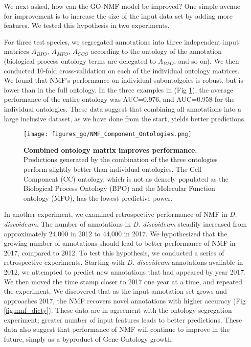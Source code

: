 \documentclass[12pt,a4paper]{report}
\begin{document}
{{We next asked, how can the GO-NMF model be improved? One simple avenue for improvement is to increase the size of the input data set by adding more features. We tested this hypothesis in two experiments.

For three test species, we segregated annotations into three independent input matrices $A_{BPO}$, $A_{MFO}$, $A_{CCO}$ according to the ontology of the annotation (biological process ontology terms are delegated to $A_{BPO}$, and so on). We then conducted 10-fold cross-validation on each of the individual ontology matrices. We found that NMF's performance on individual subontolgoies is robust, but is lower than in the full ontology. In the three examples in (Fig \ref{fig:nmf_ontologies}), the average performance of the entire ontology was AUC=0.976, and AUC=0.958 for the individual ontologies. These data suggest that combining all annotations into a large inclusive dataset, as we have done from the start, yields better predictions.

\begin{figure}
\begin{minipage}[c][\textheight]{\textwidth}
\vspace*{-5in}
\centering
  \texttt{[image: figures\_go/NMF\_Component\_Ontologies.png]}
  \caption[Combined ontology matrix improves performance.]{\textbf{Combined ontology matrix improves performance.} Predictions generated by the combination of the three ontologies perform slightly better than individual ontologies. The Cell Component (CC) ontology, which is not as densely populated as the Biological Process Ontology (BPO) and the Molecular Function ontology (MFO), has the lowest predictive power.}
  \label{fig:nmf_ontologies}
  \end{minipage}

\end{figure}

In another experiment, we examined retrospective performance of NMF in \textit{D. discoideum}. The number of annotations in \textit{D. discoideum} steadily increased from approximately 24,000 in 2012 to 44,000 in 2017. We hypothesized that the growing number of annotations should lead to better performance of NMF in 2017, compared to 2012. To test this hypothesis, we conducted a series of retrospective experiments. Starting with \textit{D. discoideum} annotations available in 2012, we attempted to predict new annotations that had appeared by year 2017. We then moved the time stamp closer to 2017 one year at a time, and repeated the experiment. We discovered that as the input annotation set grows and approaches 2017, the NMF recovers novel annotations with higher accuracy (Fig \ref{fig:nmf_dicty}). These data are in agreement with the ontology segregation experiment; greater number of input features leads to better predictions. These data also suggest that performance of NMF will continue to improve in the future, simply as a byproduct of Gene Ontology growth.

}}
\end{document}
